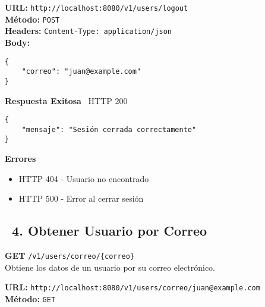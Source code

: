 \begin{tcolorbox}[request]
    \textbf{URL:} \textcolor{urlColor}{\texttt{http://localhost:8080/v1/users/logout}}\\
    \textbf{Método:} \textcolor{methodColor}{\texttt{POST}}\\
    \textbf{Headers:} \textcolor{headerColor}{\texttt{Content-Type: application/json}}\\
    \textbf{Body:}
    \begin{verbatim}
{
    "correo": "juan@example.com"
}
    \end{verbatim}
\end{tcolorbox}

\begin{tcolorbox}[response]
    \textbf{Respuesta Exitosa} \faCheckCircle\ \textcolor{successColor}{HTTP 200}
    \begin{verbatim}
{
    "mensaje": "Sesión cerrada correctamente"
}
    \end{verbatim}
    \textbf{Errores}
    \begin{itemize}
        \item \textcolor{errorColor}{HTTP 404} - Usuario no encontrado
        \item \textcolor{errorColor}{HTTP 500} - Error al cerrar sesión
    \end{itemize}
\end{tcolorbox}

\newpage

\subsection*{\faServer\ 4. Obtener Usuario por Correo}
\begin{tcolorbox}[endpoint]
    \textbf{GET} \texttt{/v1/users/correo/\{correo\}}\\
    Obtiene los datos de un usuario por su correo electrónico.
\end{tcolorbox}

\begin{tcolorbox}[request]
    \textbf{URL:} \textcolor{urlColor}{\texttt{http://localhost:8080/v1/users/correo/juan@example.com}}\\
    \textbf{Método:} \textcolor{methodColor}{\texttt{GET}}
\end{tcolorbox}

